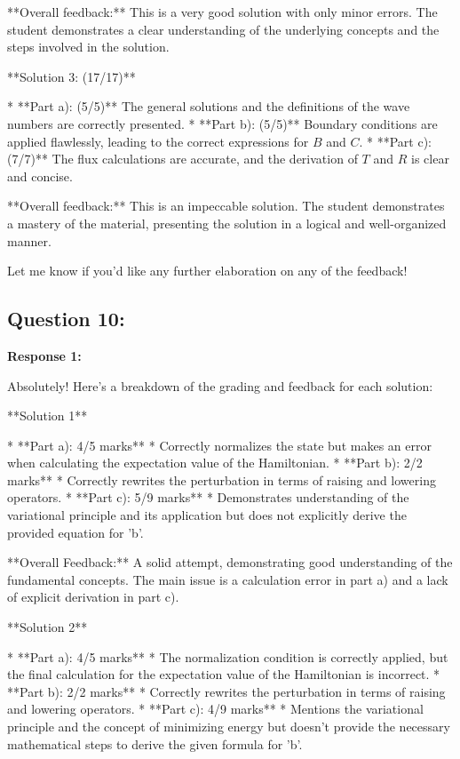 \documentclass[a4paper,11pt]{article}
\begin{document}
**Overall feedback:** This is a very good solution with only minor errors. The student demonstrates a clear understanding of the underlying concepts and the steps involved in the solution.

**Solution 3: (17/17)**

*   **Part a): (5/5)** The general solutions and the definitions of the wave numbers are correctly presented.
*   **Part b): (5/5)**  Boundary conditions are applied flawlessly, leading to the correct expressions for \( B \) and \( C \).
*   **Part c): (7/7)**  The flux calculations are accurate, and the derivation of \( T \) and \( R \) is clear and concise.

**Overall feedback:** This is an impeccable solution. The student demonstrates a mastery of the material, presenting the solution in a logical and well-organized manner.

Let me know if you'd like any further elaboration on any of the feedback! 

\subsection*{Question 10:}

\textbf{Response 1:}

Absolutely! Here's a breakdown of the grading and feedback for each solution:

**Solution 1**

* **Part a): 4/5 marks**
    * Correctly normalizes the state but makes an error when calculating the expectation value of the Hamiltonian.
* **Part b): 2/2 marks**
    * Correctly rewrites the perturbation in terms of raising and lowering operators.
* **Part c): 5/9 marks**
    * Demonstrates understanding of the variational principle and its application but does not explicitly derive the provided equation for 'b'.

**Overall Feedback:**  A solid attempt, demonstrating good understanding of the fundamental concepts. The main issue is a calculation error in part a) and a lack of explicit derivation in part c).

**Solution 2**

* **Part a): 4/5 marks**
    * The normalization condition is correctly applied, but the final calculation for the expectation value of the Hamiltonian is incorrect.
* **Part b): 2/2 marks**
    * Correctly rewrites the perturbation in terms of raising and lowering operators.
* **Part c): 4/9 marks**
    * Mentions the variational principle and the concept of minimizing energy but doesn't provide the necessary mathematical steps to derive the given formula for 'b'.
\end{document}

